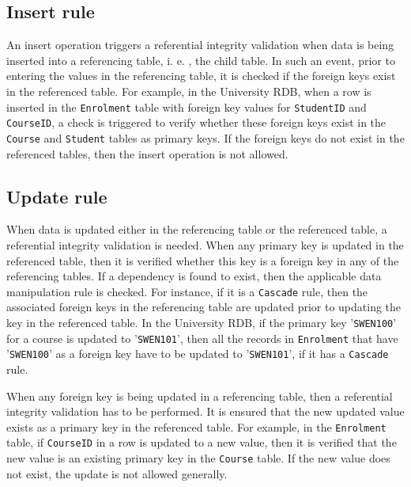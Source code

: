 
\subsection{Insert rule}
		An insert operation triggers a referential integrity
		validation when data is being inserted into a referencing table,   i. e. ,   the
		child table.  In such an event,   prior to entering the values in the
		referencing table,   it is checked if the foreign keys exist in the referenced
		table.  For example,   in the University \ac{RDB},   when a row is inserted in
		the \texttt{Enrolment} table with foreign key values for \texttt{StudentID} and
		\texttt{CourseID},   a check is triggered to verify whether these foreign keys
		exist in the \texttt{Course} and \texttt{Student} tables as primary keys.  If
		the foreign keys do not exist in the referenced tables,   then the insert
		operation is not allowed.
		
\subsection{Update rule}
 When data is updated either in the referencing table or the
		referenced table,   a referential integrity validation is needed.  When any
		primary key is updated in the referenced table, then it is verified whether this
		key is a foreign key in any of the referencing tables.  If a dependency is found
		to exist,   then the applicable data manipulation rule is checked.  For
		instance,   if it is a \texttt{Cascade} rule,   then the associated foreign keys
		in the referencing table are updated prior to updating the key in the referenced
		table.  In the University \ac{RDB}, if the primary key '\texttt{SWEN100}' for a
		course is updated to '\texttt{SWEN101}',   then all the records in
		\texttt{Enrolment} that have '\texttt{SWEN100}' as a foreign key have to be
		updated to '\texttt{SWEN101}', if it has a \texttt{Cascade} rule.
		
		When any foreign key is being updated in a referencing table,   then a
		referential integrity validation has to be performed.  It is ensured that the
		new updated value exists as a primary key in the referenced table.  For example,
		  in the \texttt{Enrolment} table,   if \texttt{CourseID} in a row is updated to
		a new value,   then it is verified that the new value is an existing primary key
		in the \texttt{Course} table.  If the new value does not exist,   the update is
		not allowed generally.
		
